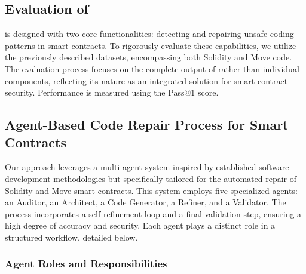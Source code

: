 \subsection{Evaluation of \sln{}} \label{evaluationmethod}

\sln{} is designed with two core functionalities: detecting and repairing unsafe coding patterns in smart contracts. To rigorously evaluate these capabilities, we utilize the previously described datasets, encompassing both Solidity and Move code. The evaluation process focuses on the complete output of \sln{} rather than individual components, reflecting its nature as an integrated solution for smart contract security. Performance is measured using the Pass@1 score.


\subsection{Agent-Based Code Repair Process for Smart Contracts}

Our approach leverages a multi-agent system inspired by established software development methodologies but specifically tailored for the automated repair of Solidity and Move smart contracts. This system employs five specialized agents: an Auditor, an Architect, a Code Generator, a Refiner, and a Validator. The process incorporates a self-refinement loop and a final validation step, ensuring a high degree of accuracy and security. Each agent plays a distinct role in a structured workflow, detailed below.

\subsubsection{Agent Roles and Responsibilities}

